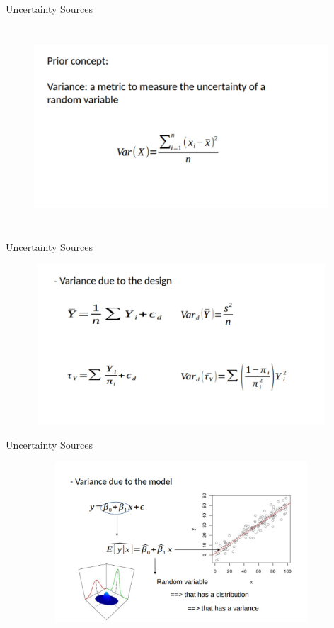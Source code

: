 \documentclass{beamer}
\begin{document}
\begin{frame} {Uncertainty Sources} 
\begin{figure}
        \centering
        \includegraphics[width = 11cm, height = 7.5cm]{pic/variancia.jpg}
        \end{figure} 
\end{frame}

\begin{frame} {Uncertainty Sources} 
\begin{figure}
        \centering
        \includegraphics[width = 11cm, height = 6cm]{pic/variduedesign.jpg}
        \end{figure} 
\end{frame}

\begin{frame} {Uncertainty Sources} 
\begin{figure}
        \centering
        \includegraphics[width = 11cm, height = 6cm]{pic/duemodel.jpg}
        \end{figure} 
\end{frame}
\end{document}
